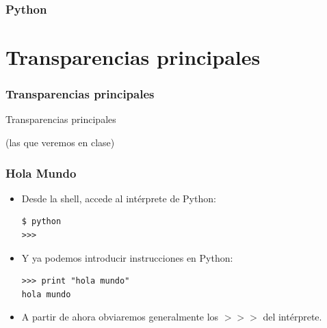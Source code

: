 \documentclass{beamer}
\begin{document}
\begin{frame}
\frametitle{Python}

\end{frame}
\usebackgroundtemplate{}


\section{Transparencias principales}

\begin{frame}
\frametitle{Transparencias principales}

\begin{center}
{\Huge Transparencias principales}

{\footnotesize (las que veremos en clase)}
\end{center}
\end{frame}


\begin{frame}[fragile]

\frametitle{Hola Mundo}

\begin{itemize}
\item Desde la shell, accede al intérprete de Python:

\begin{footnotesize}
\begin{verbatim}
$ python
>>>
\end{verbatim}
\end{footnotesize}
\item Y ya podemos introducir instrucciones en Python:

\begin{footnotesize}
\begin{verbatim}
>>> print "hola mundo"
hola mundo
\end{verbatim}
\end{footnotesize}

\item A partir de ahora obviaremos generalmente los $>>>$ del intérprete.

\end{itemize}

\end{frame}
\end{document}
